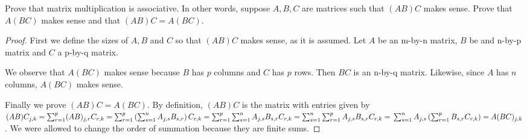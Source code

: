 \begin{exercise}{14}
  Prove that matrix multiplication is associative. In other words, suppose $A,B,C$ are matrices such that $(AB)C$ makes sense. Prove that $A(BC)$ makes sense and that $(AB)C=A(BC)$.
\end{exercise}
\begin{proof}
 First we define the sizes of $A,B$ and $C$ so that $(AB)C$ makes sense, as it is assumed. Let $A$ be an m-by-n matrix, $B$ be and n-by-p matrix and $C$ a p-by-q matrix.
 
 We observe that $A(BC)$ makes sense because $B$ has $p$ columns and $C$ has $p$ rows. Then $BC$ is an n-by-q matrix. Likewise, since $A$ has $n$ columns, $A(BC)$ makes sense.
 
 Finally we prove $(AB)C=A(BC)$. By definition, $(AB)C$ is the matrix with entries given by $(AB)C_{j,k} = \sum_{r=1}^{p}(AB)_{j,r}C_{r,k} = \sum_{r=1}^{p}\left(\sum_{s=1}^{n}A_{j,s}B_{s,r}\right)C_{r,k} = \sum_{r=1}^{p}\sum_{s=1}^{n}A_{j,s}B_{s,r}C_{r,k} = \sum_{s=1}^{n}\sum_{r=1}^{p}A_{j,s}B_{s,r}C_{r,k} =\\ \sum_{s=1}^{n}A_{j,s}\left(\sum_{r=1}^{p}B_{s,r}C_{r,k}\right) = A(BC)_{j,k}$. We were allowed to change the order of summation because they are finite sums.
\end{proof}
